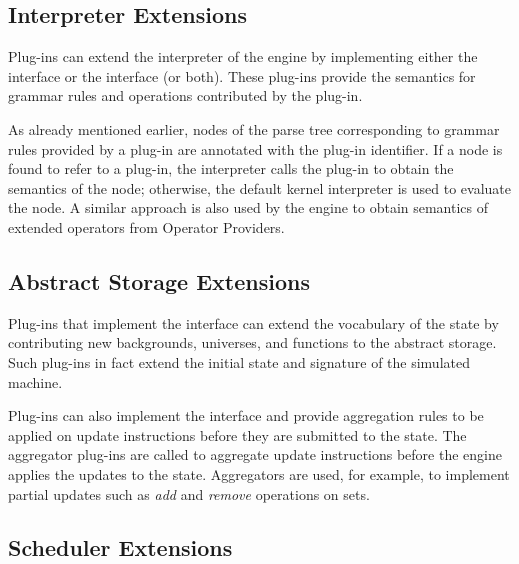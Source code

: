 \documentclass{article}
\begin{document}
\subsection{Interpreter Extensions}
\label{sec:interpreterextensions}

Plug-ins can extend the interpreter of the engine by
implementing either the  
interface or
the  interface (or both). These plug-ins
provide the semantics for grammar rules and operations contributed by the plug-in.%

As already mentioned earlier, nodes of the parse tree
corresponding to grammar rules provided by a plug-in are annotated with the
plug-in identifier. If a node is found to refer to a
plug-in, the interpreter calls the plug-in to obtain the semantics of the node; 
otherwise, the default kernel interpreter is used to evaluate the node.
A similar approach is also used by the engine 
to obtain semantics of extended operators from Operator Providers. 

\subsection{Abstract Storage Extensions}
\label{sec:astextensions}

Plug-ins that implement the  interface
 can extend the vocabulary of the
\CoreASM state by contributing new backgrounds, universes, and functions
to the abstract storage.  Such plug-ins in fact extend the initial state
and signature of the simulated machine.

Plug-ins can also implement the  interface and provide
aggregation rules to be applied on update instructions before they
are submitted to the state. The aggregator plug-ins are called to
aggregate update instructions before the engine applies the updates
to the state.
Aggregators are used, for example, to
implement partial updates such as {\em add} and {\em remove} operations
on sets. 

\subsection{Scheduler Extensions}
\label{sec:schedulerextensions}
\end{document}
